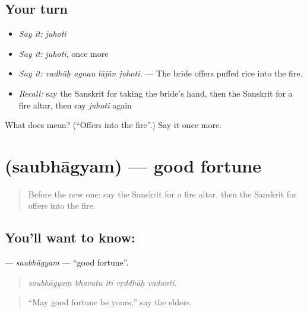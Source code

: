 \subsection*{Your turn}
\begin{itemize}
\raggedright
  \item \emph{Say it:} \emph{juhoti}
  \item \emph{Say it:} \emph{juhoti}, once more
  \item \emph{Say it:} \emph{vadhūḥ agnau lājān juhoti.} — The bride offers puffed rice into the fire.
  \item \emph{Recall:} say the Sanskrit for taking the bride's hand, then the Sanskrit for a fire altar, then say \emph{juhoti} again
\end{itemize}

\begin{tcolorbox}[breakable,colback=teal!4,colframe=teal!35!black,title={Before you move on}]
What does  mean? (\textquotedblleft{}Offers into the fire\textquotedblright{}.) Say it once more.
\end{tcolorbox}
\section[\texorpdfstring{\sk{सौभाग्यम्} (saubhāgyam)}{सौभाग्यम् (saubhāgyam)}]{ (saubhāgyam) — good fortune}

\label{lesson:SA-C497-saubhagyam}



\begin{quote}
Before the new one: say the Sanskrit for a fire altar, then the Sanskrit for offers into the fire.
\end{quote}

\subsection*{You'll want to know: }
\textbf{} — \emph{saubhāgyam} — \textquotedblleft{}good fortune\textquotedblright{}.

\begin{quote}
    
\end{quote}

\begin{quote}
\emph{saubhāgyaṃ bhavatu iti vṛddhāḥ vadanti.}
\end{quote}

\begin{quote}
\textquotedblleft{}May good fortune be yours,\textquotedblright{} say the elders.
\end{quote}

